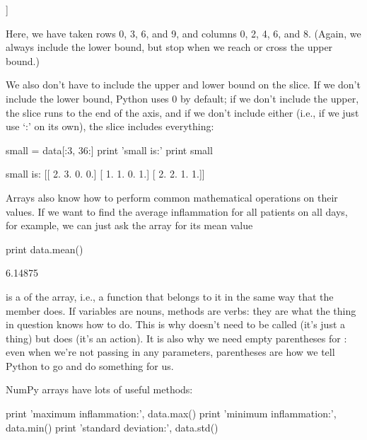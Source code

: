 \begin{VerbOut}
[[ 0.  1.  1.  4.  8.]
 [ 0.  2.  4.  2.  6.]
 [ 0.  2.  4.  2.  5.]
 [ 0.  1.  1.  5.  5.]]
\end{VerbOut}

Here, we have taken rows 0, 3, 6, and 9, and columns 0, 2, 4, 6, and 8.
(Again, we always include the lower bound, but stop when we reach or
cross the upper bound.)

We also don't have to include the upper and lower bound on the slice. If
we don't include the lower bound, Python uses 0 by default; if we don't
include the upper, the slice runs to the end of the axis, and if we
don't include either (i.e., if we just use `:' on its own), the slice
includes everything:

\begin{VerbIn}
small = data[:3, 36:]
print 'small is:'
print small
\end{VerbIn}

\begin{VerbOut}
small is:
[[ 2.  3.  0.  0.]
 [ 1.  1.  0.  1.]
 [ 2.  2.  1.  1.]]
\end{VerbOut}

Arrays also know how to perform common mathematical operations on their
values. If we want to find the average inflammation for all patients on
all days, for example, we can just ask the array for its mean value

\begin{VerbIn}
print data.mean()
\end{VerbIn}

\begin{VerbOut}
6.14875
\end{VerbOut}

 is a  of the array, i.e., a
function that belongs to it in the same way that the member
 does. If variables are nouns, methods are verbs: they are
what the thing in question knows how to do. This is why
 doesn't need to be called (it's just a thing) but
 does (it's an action). It is also why we need empty
parentheses for : even when we're not passing in any
parameters, parentheses are how we tell Python to go and do something
for us.

NumPy arrays have lots of useful methods:

\begin{VerbIn}
print 'maximum inflammation:', data.max()
print 'minimum inflammation:', data.min()
print 'standard deviation:', data.std()
\end{VerbIn}

